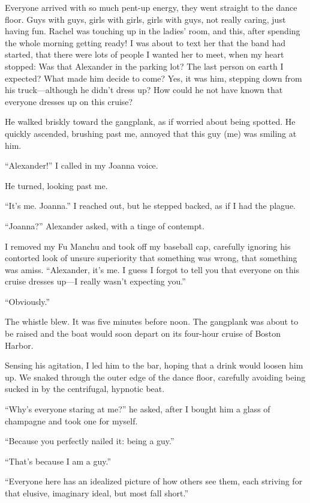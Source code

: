 Everyone arrived with so much pent-up energy, they went straight to the
dance floor. Guys with guys, girls with girls, girls with guys, not
really caring, just having fun. Rachel was touching up in the ladies'
room, and this, after spending the whole morning getting ready! I was
about to text her that the band had started, that there were lots of
people I wanted her to meet, when my heart stopped: Was that Alexander
in the parking lot? The last person on earth I expected? What made him
decide to come? Yes, it was him, stepping down from his truck---although
he didn't dress up? How could he not have known that everyone dresses up
on this cruise?

He walked briskly toward the gangplank, as if worried about being
spotted. He quickly ascended, brushing past me, annoyed that this guy
(me) was smiling at him.

``Alexander!'' I called in my Joanna voice.

He turned, looking past me.

``It's me. Joanna.'' I reached out, but he stepped backed, as if I had
the plague.

``Joanna?'' Alexander asked, with a tinge of contempt.

I removed my Fu Manchu and took off my baseball cap, carefully ignoring
his contorted look of unsure superiority that something was wrong, that
something was amiss. ``Alexander, it's me. I guess I forgot to tell you
that everyone on this cruise dresses up---I really wasn't expecting
you.''

``Obviously.''

The whistle blew. It was five minutes before noon. The gangplank was
about to be raised and the boat would soon depart on its four-hour
cruise of Boston Harbor.

Sensing his agitation, I led him to the bar, hoping that a drink would
loosen him up. We snaked through the outer edge of the dance floor,
carefully avoiding being sucked in by the centrifugal, hypnotic beat.

``Why's everyone staring at me?'' he asked, after I bought him a glass
of champagne and took one for myself.

``Because you perfectly nailed it: being a guy.''

``That's because I am a guy.''

``Everyone here has an idealized picture of how others see them, each
striving for that elusive, imaginary ideal, but most fall short.''


